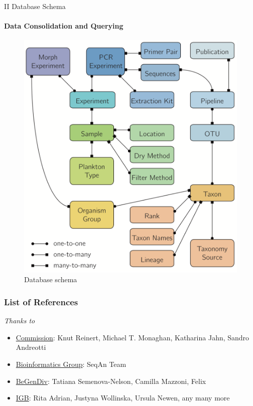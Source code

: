 \documentclass[xcolor=dvipsnames,envcountsect]{beamer}
\begin{document}
\begin{frame}{II Database Schema}\framesubtitle{Data Consolidation and Querying}
  \begin{figure}\centering
    \includegraphics[scale=.3]{DB_schema}
    \caption{Database schema \cite{PlanktonDB}}
    \end{figure}
\end{frame}


	\begin{frame}[allowframebreaks]
		\justifying
		\frametitle{List of References}
		\printbibliography
	\end{frame}
	\begin{frame}
		\centering
		\begin{block}
			\scshape
				\begin{center}
					\large\emph{Thanks to} %
				\end{center}
				\begin{itemize}
				    \item \underline{Commission}: Knut Reinert, Michael T. Monaghan, Katharina Jahn, Sandro Andreotti
				    \item \underline{Bioinformatics Group}: SeqAn Team
				    \item \underline{BeGenDiv}: Tatiana Semenova-Nelson, Camilla Mazzoni, Felix
				    \item \underline{IGB}: Rita Adrian, Justyna Wollinska, Ursula Newen, any many more
				\end{itemize}
		\end{block}
    \nocite{Burki2020, PriSeT2021}
	\end{frame}
\end{document}
